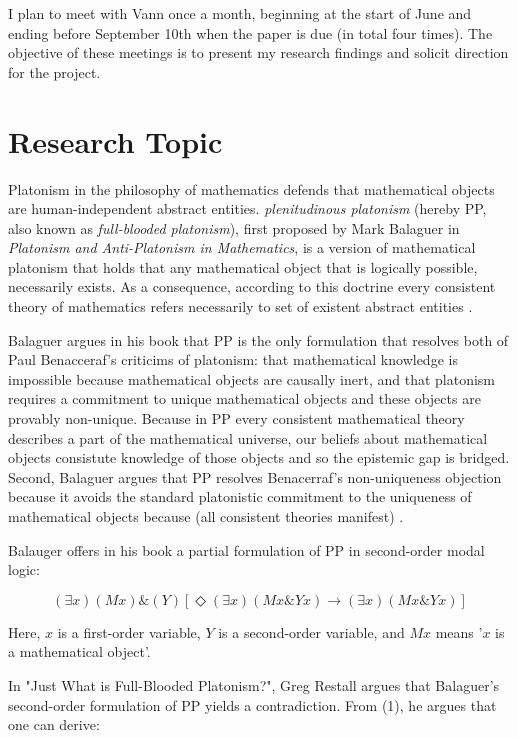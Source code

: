 \documentclass[12pt]{article}
\theoremstyle{definition}
\begin{document}
I plan to meet with Vann once a month, beginning at the start of June and
ending before September 10th when the paper is due (in total four times).  The
objective of these meetings is to present my research findings and solicit
direction for the project.

\section{Research Topic}

Platonism in the philosophy of mathematics defends that mathematical objects
are human-independent abstract entities.  \textit{plenitudinous platonism} (hereby PP, also known as \textit{full-blooded platonism}), first proposed by Mark Balaguer in
\textit{Platonism and Anti-Platonism in Mathematics}, is a version of
mathematical platonism that holds that any mathematical object that is
logically possible, necessarily exists. As a consequence, according to this
doctrine every consistent theory of mathematics refers necessarily to set of
existent abstract entities \cite{balaguer}.

Balaguer argues in his book that PP is the only formulation that resolves both
of Paul Benacceraf's criticims of platonism: that mathematical knowledge is
impossible because mathematical objects are causally inert, and that platonism
requires a commitment to unique mathematical objects and these objects are
provably non-unique.  Because in PP every consistent mathematical theory
describes a part of the mathematical universe, our beliefs about mathematical
objects consistute knowledge of those objects and so the epistemic gap is
bridged. Second, Balaguer argues that PP resolves Benacerraf's non-uniqueness
objection because it avoids the standard platonistic commitment to the
uniqueness of mathematical objects because (all consistent theories manifest)
\cite{review}.

Balauger offers in his book a partial formulation of PP in second-order modal
logic:

\begin{equation}
(\exists x)(Mx) \& (Y)[\Diamond (\exists x) (Mx \& Yx) \rightarrow (\exists x)(Mx \& Yx)]
\end{equation}

Here, $x$ is a first-order variable, $Y$ is a second-order variable, and $Mx$
means '$x$ is a mathematical object'.

In "Just What is Full-Blooded Platonism?", Greg Restall argues that Balaguer's
second-order formulation of PP yields a contradiction. From (1), he argues that one can derive:
\end{document}
